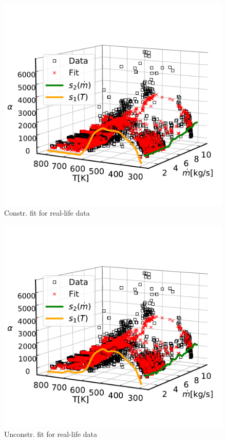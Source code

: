 \documentclass[10pt,a4paper]{article}
\begin{document}
\begin{figure}[H]
	\centering
	\includegraphics[width=\columnwidth]{../thesisplots/ebner/Model_constraint_lam_s1_383_lam_s2_908.pdf}
	\caption{Constr. fit for real-life data}
	\label{fig:ebner_fit_s250}
\end{figure}

\begin{figure}[H]
	\centering
	\includegraphics[width=\columnwidth]{../thesisplots/ebner/Model_unc_lam_s1_383_lam_s2_908.pdf}
	\caption{Unconstr. fit for real-life data}
	\label{fig:ebner_fit_unc_s250}
\end{figure}
\end{document}
